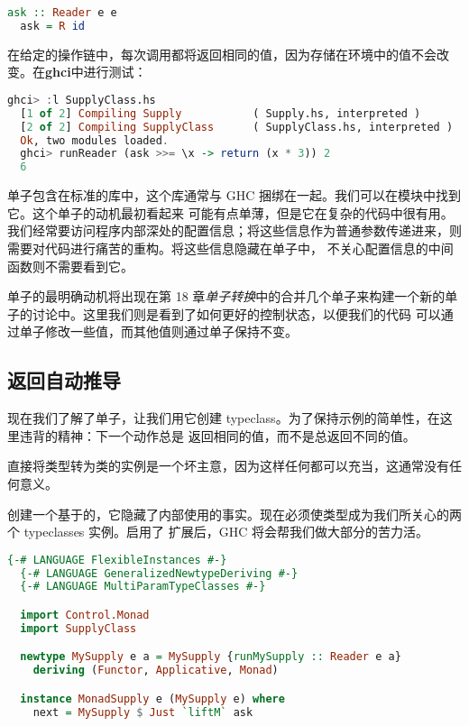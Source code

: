\documentclass[./main.tex]{subfiles}
\begin{document}
\begin{lstlisting}[language=Haskell]
  ask :: Reader e e
  ask = R id
\end{lstlisting}

在给定的操作链中，每次调用都将返回相同的值，因为存储在环境中的值不会改变。在\textbf{ghci}中进行测试：

\begin{lstlisting}[language=Haskell]
  ghci> :l SupplyClass.hs
  [1 of 2] Compiling Supply           ( Supply.hs, interpreted )
  [2 of 2] Compiling SupplyClass      ( SupplyClass.hs, interpreted )
  Ok, two modules loaded.
  ghci> runReader (ask >>= \x -> return (x * 3)) 2
  6
\end{lstlisting}

单子包含在标准的库中，这个库通常与 GHC 捆绑在一起。我们可以在模块中找到它。这个单子的动机最初看起来
可能有点单薄，但是它在复杂的代码中很有用。我们经常要访问程序内部深处的配置信息；将这些信息作为普通参数传递进来，则需要对代码进行痛苦的重构。将这些信息隐藏在单子中，
不关心配置信息的中间函数则不需要看到它。

单子的最明确动机将出现在第 18 章\textit{单子转换}中的合并几个单子来构建一个新的单子的讨论中。这里我们则是看到了如何更好的控制状态，以便我们的代码
可以通过单子修改一些值，而其他值则通过单子保持不变。

\subsection*{返回自动推导}

现在我们了解了单子，让我们用它创建 typeclass。为了保持示例的简单性，在这里违背的精神：下一个动作总是
返回相同的值，而不是总返回不同的值。

直接将类型转为类的实例是一个坏主意，因为这样任何都可以充当，这通常没有任何意义。

创建一个基于的，它隐藏了内部使用的事实。现在必须使类型成为我们所关心的两个 typeclasses 实例。启用了
扩展后，GHC 将会帮我们做大部分的苦力活。

\begin{lstlisting}[language=Haskell]
  {-# LANGUAGE FlexibleInstances #-}
  {-# LANGUAGE GeneralizedNewtypeDeriving #-}
  {-# LANGUAGE MultiParamTypeClasses #-}

  import Control.Monad
  import SupplyClass

  newtype MySupply e a = MySupply {runMySupply :: Reader e a}
    deriving (Functor, Applicative, Monad)

  instance MonadSupply e (MySupply e) where
    next = MySupply $ Just `liftM` ask
\end{lstlisting}
\end{document}

